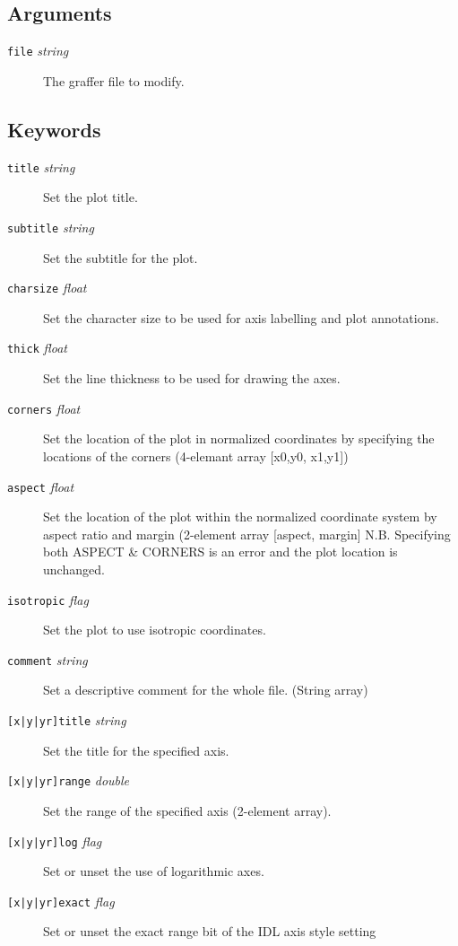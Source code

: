 \documentclass[11pt,twoside,english]{article}
\begin{document}
\subsection{Arguments}
\label{sec:gp_args}
\begin{description}
\item[\texttt{file} \textit{string}] The graffer file to modify.
\end{description}


\subsection{Keywords}
\label{sec:gp_key}

\begin{description}
\item[\texttt{title} \textit{string}] Set the plot title.
\item[\texttt{subtitle} \textit{string}] Set the subtitle for the plot.
\item[\texttt{charsize} \textit{float}] Set the character size to be
  used for axis labelling and plot annotations.
\item[\texttt{thick} \textit{float}] Set the line thickness to be used
  for drawing the axes.
\item[\texttt{corners} \textit{float}] Set the location of the plot in
  normalized coordinates by specifying the locations of the corners
  (4-elemant array [x0,y0, x1,y1])
\item[\texttt{aspect} \textit{float}] Set the location of the plot
  within the normalized coordinate system by aspect ratio and margin
  (2-element array [aspect, margin] N.B. Specifying both ASPECT \&
  CORNERS is an error and the plot location is unchanged.
\item[\texttt{isotropic} \textit{flag}] Set the plot to use isotropic
  coordinates.
\item[\texttt{comment} \textit{string}] Set a descriptive comment for
  the whole file. (String array)
\item[\texttt{{[x|y|yr]}title} \textit{string}] Set the title for the
  specified axis.
\item[\texttt{{[x|y|yr]}range} \textit{double}] Set the range of the
  specified axis (2-element array).
\item[\texttt{{[x|y|yr]}log} \textit{flag}] Set or unset the use of
  logarithmic axes.
\item[\texttt{{[x|y|yr]}exact} \textit{flag}] Set or unset the exact
  range bit of the IDL axis style setting

\end{description}
\end{document}
